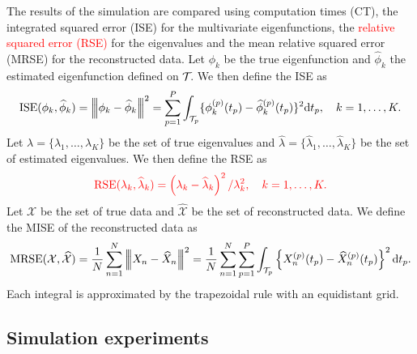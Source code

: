 The results of the simulation are compared using computation times (CT), the integrated squared error (ISE) for the multivariate eigenfunctions, the \textcolor{red}{relative squared error (RSE)} for the eigenvalues and the mean relative squared error (MRSE) for the reconstructed data. Let $\phi_k$ be the true eigenfunction and $\widehat{\phi}_k$ the estimated eigenfunction defined on $\mathcal{T}_{}$. We then define the ISE as 
\begin{equation}\label{eq:ise_eigenfunctions}
    \text{ISE}(\phi_k, \widehat{\phi}_k) = \left|\!\left|\!\left|\phi_k - \widehat{\phi}_k\right|\!\right|\!\right|^2 = \sum_{p = 1}^P \int_{\mathcal{T}_{p}} \{\phi^{(p)}_k(t_p) - \widehat{\phi}^{(p)}_k(t_p)\}^2 {\rm d} t_p, \quad k = 1, \dots, K.
\end{equation}
Let $\lambda = \{\lambda_1, \dots, \lambda_K\}$ be the set of true eigenvalues and $\widehat{\lambda} = \{\widehat{\lambda}_1, \dots, \widehat{\lambda}_K\}$ be the set of estimated eigenvalues. We then define the RSE as 
\begin{equation}\label{eq:mse_eigenvalues}
    \textcolor{red}{\text{RSE}(\lambda_k, \widehat{\lambda}_k) = \left(\lambda_k - \widehat{\lambda}_k\right)^2 / \lambda_k^2, \quad k = 1, \dots, K.}
\end{equation}
Let $\mathcal{X}$ be the set of true data and $\widehat{\mathcal{X}}$ be the set of reconstructed data. We define the MISE of the reconstructed data as
\begin{equation}\label{eq:mise_reconstructed_data}
    \text{MRSE}(\mathcal{X}, \widehat{\mathcal{X}}) = \frac{1}{N}\sum_{n = 1}^N \left|\!\left|\!\left|X_n - \widehat{X}_n\right|\!\right|\!\right|^2 = \frac{1}{N}\sum_{n = 1}^N \sum_{p = 1}^P \int_{\mathcal{T}_{p}} \left\{X_n^{(p)}(t_p) - \widehat{X}_n^{(p)}(t_p) \right\}^2 {\rm d} t_p.
\end{equation}
Each integral is approximated by the trapezoidal rule with an equidistant grid.

\subsection{Simulation experiments} %
\label{sub:simulation_experiments}

